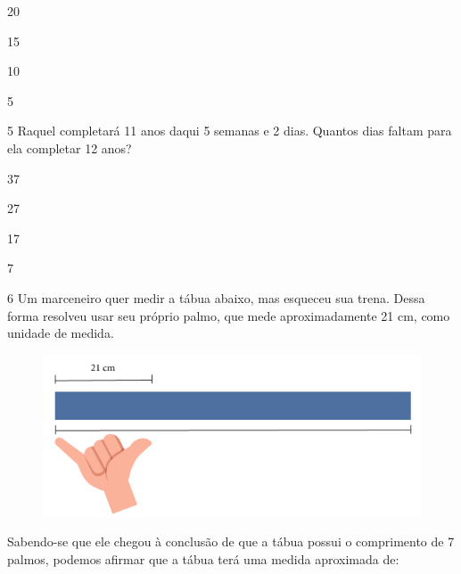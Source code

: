 \begin{minipage}{.5\textwidth}
\begin{escolha}
\item
  20
\item
  15
\item
  10
\item
  5
\end{escolha}
\end{minipage}



\num{5} Raquel completará 11 anos daqui 5 semanas e 2 dias. Quantos dias
faltam para ela completar 12 anos?

\begin{minipage}{.5\textwidth}
\begin{escolha}
\item
  37
\item
  27
\item
  17
\item
  7
\end{escolha}
\end{minipage}

\pagebreak
\num{6} Um marceneiro quer medir a tábua abaixo, mas esqueceu sua trena.
Dessa forma resolveu usar seu próprio palmo, que mede aproximadamente 
21 cm, como unidade de medida.

\begin{figure}[htpb!]
\includegraphics[width=\textwidth]{../ilustracoes/MAT5/SAEB_5ANO_MAT_figura117.png}
\end{figure}

Sabendo-se que ele chegou à conclusão de que a tábua possui o comprimento
de 7 palmos, podemos afirmar que a tábua terá uma medida aproximada
de:


